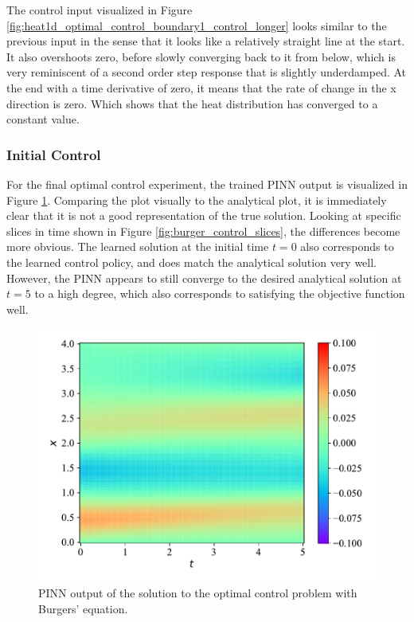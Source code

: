 The control input visualized in Figure \ref{fig:heat1d_optimal_control_boundary1_control_longer} looks similar to the previous input in the sense that it looks like a relatively straight line at the start. It also overshoots zero, before slowly converging back to it from below, which is very reminiscent of a second order step response that is slightly underdamped. At the end with a time derivative of zero, it means that the rate of change in the x direction is zero. Which shows that the heat distribution has converged to a constant value.

\subsubsection{Initial Control}

For the final optimal control experiment, the trained PINN output is visualized in Figure \ref{fig:burger_control}. Comparing the plot visually to the analytical plot, it is immediately clear that it is not a good representation of the true solution. Looking at specific slices in time shown in Figure \ref{fig:burger_control_slices}, the differences become more obvious. The learned solution at the initial time $t = 0$ also corresponds to the learned control policy, and does match the analytical solution very well. However, the PINN appears to still converge to the desired analytical solution at $t = 5$ to a high degree, which also corresponds to satisfying the objective function well.

\begin{figure}[H]
    \centering
    \includegraphics[width=1.0\linewidth]{Figures/IntermediateExperiments/OptimalControl/burger_control.pdf}
    \caption{PINN output of the solution to the optimal control problem with Burgers' equation.}
    \label{fig:burger_control}
\end{figure}

